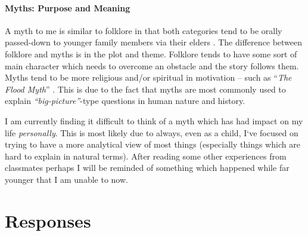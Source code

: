 \documentclass[12pt]{article}
\theoremstyle{definition}
\theoremstyle{plain}
\begin{document}
      \subsection{Myths: Purpose and Meaning}
        A myth to me is similar to folklore in that both categories tend to be
          orally passed-down to younger family members via their elders
          \autocite[p.~xiii]{textbook}. The difference between folklore and
          myths is in the plot and theme. Folklore tends to have some sort of
          main character which needs to overcome an obstacle and the story
          follows them. Myths tend to be more religious and/or spiritual in
          motivation -- such as ``\textit{The Flood Myth}''
          \autocite[p.~xiv]{textbook}. This is due to the fact that myths are
          most commonly used to explain \textit{``big-picture''}-type
          questions in human nature and history.

        I am currently finding it difficult to think of a myth which has had
          impact on my life \textit{personally}. This is most likely due to
          always, even as a child, I`ve focused on trying to have a more
          analytical view of most things (especially things which are hard
          to explain in natural terms). After reading some other experiences
          from classmates perhaps I will be reminded of something which happened
          while far younger that I am unable to now.


  \newpage
  \part{Responses}
\end{document}
